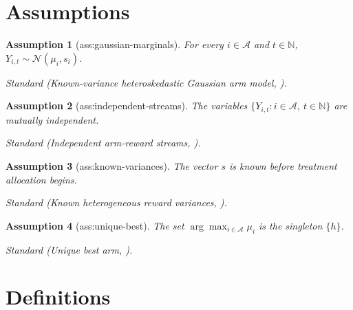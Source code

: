 \documentclass{article}
\newtheorem{assumption}{Assumption}
\begin{document}
\section{Assumptions}

\begin{assumption}[ass:gaussian-marginals]\label{ass:gaussian-marginals}
For every \(i\in\mathcal A\) and \(t\in\mathbb N\), \(Y_{i,t}\sim\mathcal N(\mu_i,s_i)\).
\par\smallskip\noindent\emph{Standard} (Known-variance heteroskedastic Gaussian arm model, \cite{Kato2023WorstCaseGaussian}).
\end{assumption}

\begin{assumption}[ass:independent-streams]\label{ass:independent-streams}
The variables \(\{Y_{i,t}:i\in\mathcal A,\ t\in\mathbb N\}\) are mutually independent.
\par\smallskip\noindent\emph{Standard} (Independent arm-reward streams, \cite{WangTzengProutiere2023}).
\end{assumption}

\begin{assumption}[ass:known-variances]\label{ass:known-variances}
The vector \(s\) is known before treatment allocation begins.
\par\smallskip\noindent\emph{Standard} (Known heterogeneous reward variances, \cite{LalithaKalantariMaDeorasKveton2023}).
\end{assumption}

\begin{assumption}[ass:unique-best]\label{ass:unique-best}
The set \(\arg\max_{i\in\mathcal A}\mu_i\) is the singleton \(\{h\}\).
\par\smallskip\noindent\emph{Standard} (Unique best arm, \cite{Qin2022OpenProblem}).
\end{assumption}

\section{Definitions}
\end{document}
